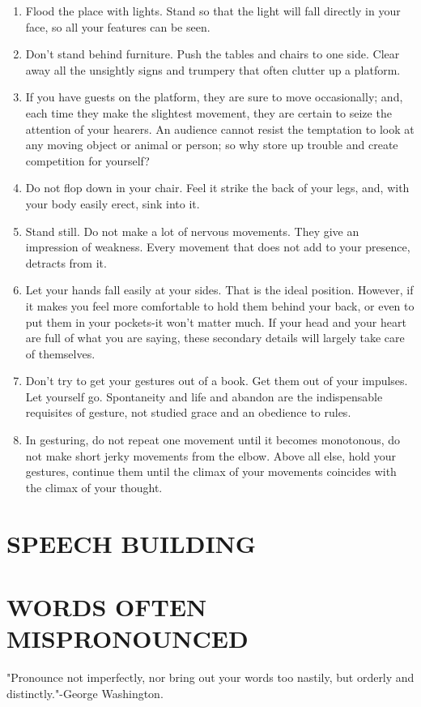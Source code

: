 \documentclass[10pt]{article}
\begin{document}
\begin{enumerate}
  \item Flood the place with lights. Stand so that the light will fall directly in your face, so all your features can be seen.
  \item Don't stand behind furniture. Push the tables and chairs to one side. Clear away all the unsightly signs and trumpery that often clutter up a platform.
  \item If you have guests on the platform, they are sure to move occasionally; and, each time they make the slightest movement, they are certain to seize the attention of your hearers. An audience cannot resist the temptation to look at any moving object or animal or person; so why store up trouble and create competition for yourself?
  \item Do not flop down in your chair. Feel it strike the back of your legs, and, with your body easily erect, sink into it.
  \item Stand still. Do not make a lot of nervous movements. They give an impression of weakness. Every movement that does not add to your presence, detracts from it.
  \item Let your hands fall easily at your sides. That is the ideal position. However, if it makes you feel more comfortable to hold them behind your back, or even to put them in your pockets-it won't matter much. If your head and your heart are full of what you are saying, these secondary details will largely take care of themselves.
  \item Don't try to get your gestures out of a book. Get them out of your impulses. Let yourself go. Spontaneity and life and abandon are the indispensable requisites of gesture, not studied grace and an obedience to rules.
  \item In gesturing, do not repeat one movement until it becomes monotonous, do not make short jerky movements from the elbow. Above all else, hold your gestures, continue them until the climax of your movements coincides with the climax of your thought.
\end{enumerate}

\section*{SPEECH BUILDING}
\section*{WORDS OFTEN MISPRONOUNCED}
"Pronounce not imperfectly, nor bring out your words too nastily, but orderly and distinctly."-George Washington.
\end{document}
